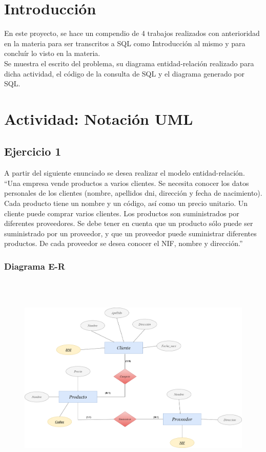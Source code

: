\documentclass[a4paper, 12pt]{article}
\begin{document}
    \newpage
    \begin{justify}
        \setcounter{page}{1}
        \pagestyle{fancy}
        \section*{Introducción}
        \justify
        En este proyecto, se hace un compendio de 4 trabajos realizados con anterioridad en la materia para ser transcritos a SQL como
        Introducción al mismo y para concluír lo visto en la materia.
        \\\newline
        Se muestra el escrito del problema, su diagrama entidad-relación realizado para dicha actividad, el código de la consulta de SQL y el
        diagrama generado por SQL.
        \section{Actividad: Notación UML}
        \subsection{Ejercicio 1}
        \justify
        A partir del siguiente enunciado se desea realizar el modelo entidad-relación.
        ``Una empresa vende productos a varios clientes. Se necesita conocer los datos personales de los clientes
        (nombre, apellidos dni, dirección y fecha de nacimiento). Cada producto tiene un nombre y un código, así como un precio
        unitario. Un cliente puede comprar varios clientes. Los productos son suministrados por diferentes proveedores.
        Se debe tener en cuenta que un producto sólo puede ser suministrado por un proveedor, y que un proveedor puede
        suministrar diferentes productos. De cada proveedor se desea conocer el NIF, nombre y dirección.''
        \subsubsection{Diagrama E-R}
        \begin{figure}[H]
            \centering
            \includegraphics[width=16cm,height=10cm]{er1.png}
        \end{figure}

\end{justify}
\end{document}
